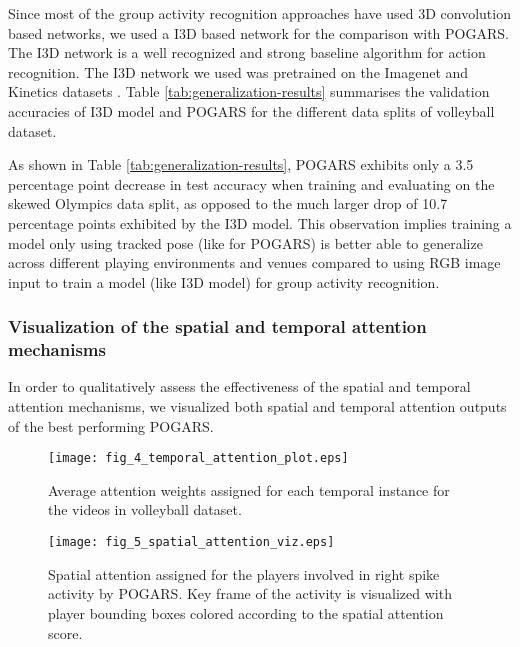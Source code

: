 \documentclass[a4paper,fleqn]{cas-dc}
\begin{document}
Since most of the group activity recognition approaches \cite{Azar2019_convoRelational,Tran2015_C3D,Lu2019_spatioTempAtt} have used 3D convolution based networks, we used a I3D based network \cite{Carreira2017_kinetics} for the comparison with POGARS. 
The I3D network is a well recognized and strong baseline algorithm for action recognition. 
The I3D network we used was pretrained on the Imagenet \cite{simonyan2014_veryDeep} and Kinetics datasets \cite{Carreira2017_kinetics}. 
Table \ref{tab:generalization-results} summarises the validation accuracies of I3D model and POGARS for the different data splits of volleyball dataset.

As shown in Table \ref{tab:generalization-results}, POGARS exhibits only a 3.5 percentage point decrease in test accuracy when training and evaluating on the skewed Olympics data split, as opposed to the much larger drop of 10.7 percentage points exhibited by the I3D model.
This observation implies training a model only using tracked pose (like for POGARS) is better able to generalize across different playing environments and venues compared to using RGB image input to train a model (like I3D model) for group activity recognition.

\subsubsection{Visualization of the spatial and temporal attention mechanisms}
\label{ssec:visualization-attention-mechanisms}

In order to qualitatively assess the effectiveness of the spatial and temporal attention mechanisms, we visualized both spatial and temporal attention outputs of the best performing POGARS.

\begin{figure}[pos=t]
  \texttt{[image: fig\_4\_temporal\_attention\_plot.eps]}
  \caption{Average attention weights assigned for each temporal instance for the videos in volleyball dataset.}
  \label{fig:temporal-attention}
\end{figure}

\begin{figure*}
  \texttt{[image: fig\_5\_spatial\_attention\_viz.eps]}
  \caption{Spatial attention assigned for the players involved in right spike
  activity by POGARS. Key frame of the activity is visualized with player
  bounding boxes colored according to the spatial attention score.}
  \label{fig:spatial-attention}
\end{figure*}
\end{document}
